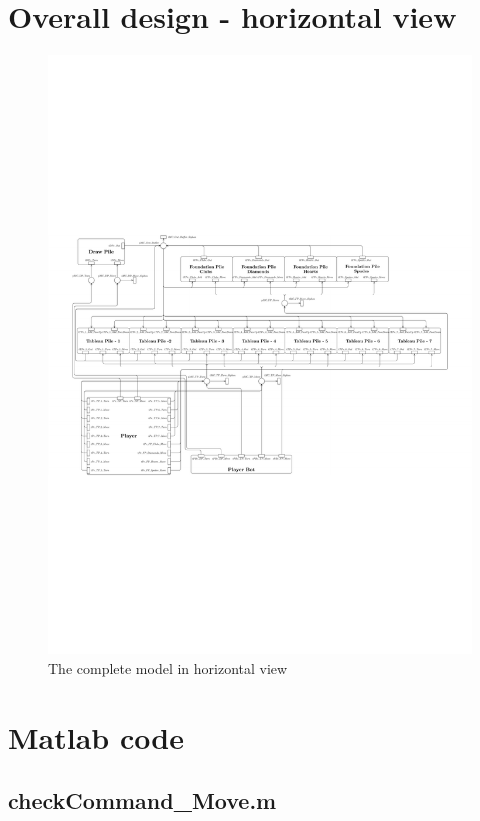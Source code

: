 \documentclass[runningheads,a4paper]{llncs}
\newcommand{\GPenSIM}{../GPenSIM}
\begin{document}
\section{Overall design - horizontal view}
\begin{figure}
	\label{fig:full_vertical}
	\includegraphics[trim=40 100 100 310,angle=90,scale=1.4]{images/overallViewPdf}
	\caption{The complete model in horizontal view}
\end{figure}
\clearpage
\section{Matlab code}	
\subsection{checkCommand\_Move.m}
\label{app:checkCommand_Move.m}

\end{document}
